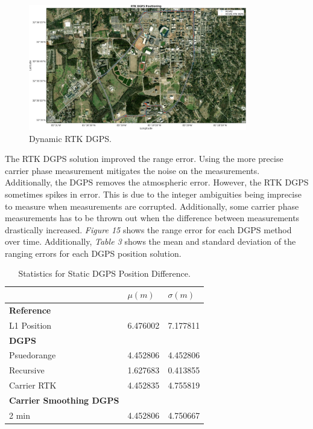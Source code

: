 \documentclass[11pt]{article}
\begin{document}
\begin{enumerate}[label=\textbf{\arabic*.}]
\begin{figure}[H]
            \centering
            \includegraphics[width=0.85\textwidth]{p3_d.png}
            \caption{Dynamic RTK DGPS.}
        \end{figure}
The RTK DGPS solution improved the range error. Using the more precise carrier phase measurement mitigates the noise on the measurements. Additionally, the DGPS removes the atmospheric error. However, the RTK DGPS sometimes spikes in error. This is due to the integer ambiguities being imprecise to measure when measurements are corrupted. Additionally, some carrier phase measurements has to be thrown out when the difference between measurements drastically increased. \emph{Figure 15} shows the range error for each DGPS method over time. Additionally, \emph{Table 3} shows the mean and standard deviation of the ranging errors for each DGPS position solution.
     \begin{table}[H]
          \centering
          \caption{Statistics for Static DGPS Position Difference.}
          \begin{tabular}{ P{5cm}|P{3cm} P{3cm} }
             & \boldmath$\mu (m)$ & \boldmath$\sigma (m)$ \\
             \hline
             \textbf{Reference} &  \\
             L1 Position & 6.476002 & 7.177811 \\
             \hline
             \textbf{DGPS} &  \\
             Psuedorange & 4.452806 & 4.452806 \\
             Recursive & 1.627683 & 0.413855 \\
             Carrier RTK & 4.452835 & 4.755819 \\
             \hline
             \textbf{Carrier Smoothing DGPS} &  \\
             2 min & 4.452806 & 4.750667 \\

\end{tabular}
\end{table}
\end{enumerate}
\end{document}
